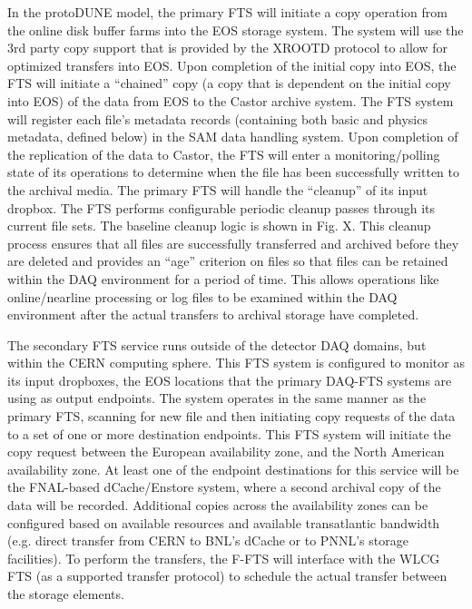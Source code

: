 In the protoDUNE model, the primary FTS will initiate a copy operation from the online disk buffer farms into the EOS storage system.  The system will use the 3rd party copy support that is provided by the XROOTD protocol to allow for optimized transfers into EOS.  Upon completion of the initial copy into EOS, the FTS will initiate a “chained” copy (a copy that is dependent on the initial copy into EOS) of the data from EOS to the Castor archive system.  The FTS system will register each file’s metadata records (containing both basic and physics metadata, defined below)  in the SAM data handling system.  Upon completion of the replication of the data to Castor, the FTS will enter a monitoring/polling state of its operations to determine when the file has been successfully written to the archival media.
The primary FTS will handle the “cleanup” of its input dropbox.  The FTS performs configurable periodic cleanup passes through its current file sets.  The baseline cleanup logic is shown in Fig. X.  This cleanup process ensures that all files are successfully transferred and archived before they are deleted and provides an “age” criterion on files so that files can be retained within the DAQ environment for a period of time.  This allows operations like online/nearline processing or log files to be examined within the DAQ environment after the actual transfers to archival storage have completed.


The secondary FTS service runs outside of the detector DAQ domains, but within the CERN computing sphere.  This FTS system is configured to monitor as its input dropboxes, the EOS locations that the primary DAQ-FTS systems are using as output endpoints.  The system operates in the same manner as the primary FTS, scanning for new file and then initiating copy requests of the data to a set of one or more destination endpoints.  This FTS system will initiate the copy request between the European availability zone, and the North American availability zone.  At least one of the endpoint destinations for this service will be the FNAL-based dCache/Enstore system, where a second archival copy of the data will be recorded.  Additional copies across the availability zones can be configured based on available resources and available transatlantic bandwidth (e.g. direct transfer from CERN to BNL’s dCache or to PNNL’s storage facilities).  To perform the transfers, the F-FTS will interface with the WLCG FTS (as a supported transfer protocol) to schedule the actual transfer between the storage elements.  